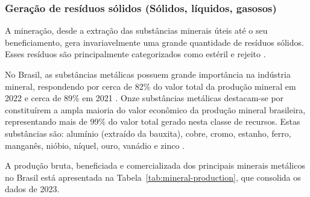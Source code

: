\subsubsection{Geração de resíduos sólidos (Sólidos, líquidos, gasosos)}

A mineração, desde a extração das substâncias minerais úteis até o seu beneficiamento, gera invariavelmente uma grande quantidade de resíduos sólidos. Esses resíduos são principalmente categorizados como estéril e rejeito \cite{freire2020}.

No Brasil, as substâncias metálicas possuem grande importância na indústria mineral, respondendo por cerca de 82\% do valor total da produção mineral em 2022 \cite{anm2023a} e cerca de 89\% em 2021 \cite{anm2022}. Onze substâncias metálicas destacam-se por constituírem a ampla maioria do valor econômico da produção mineral brasileira, representando mais de 99\% do valor total gerado nesta classe de recursos. Estas substâncias são: alumínio (extraído da bauxita), cobre, cromo, estanho, ferro, manganês, nióbio, níquel, ouro, vanádio e zinco \cite{anm2023a}.

A produção bruta, beneficiada e comercializada dos principais minerais metálicos no Brasil está apresentada na Tabela~\ref{tab:mineral-production}, que consolida os dados de 2023.

